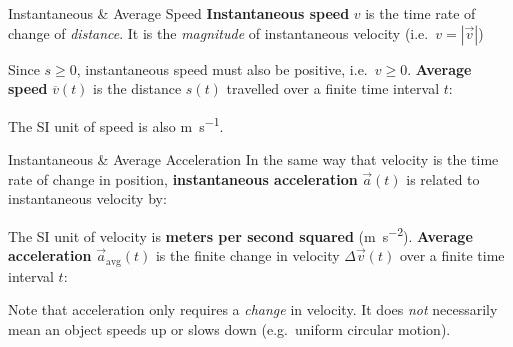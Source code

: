 \documentclass[12pt,compress,aspectratio=169,dvipsnames]{beamer}
\begin{document}
\begin{frame}{Instantaneous \& Average Speed}
  \textbf{Instantaneous speed} $v$ is the time rate of change of
  \emph{distance}. It is the \emph{magnitude} of instantaneous velocity
  (i.e.\ $v=|\vec v|$)


  Since $s\geq 0$, instantaneous speed must also be positive, i.e.\ $v\geq 0$.
  \textbf{Average speed} $\overline{v}(t)$ is the distance $s(t)$ travelled
  over a finite time interval $t$:
  

  The SI unit of speed is also \si{\metre\per\second}.
\end{frame}





\begin{frame}{Instantaneous \& Average Acceleration}
  In the same way that velocity is the time rate of change in position,
  \textbf{instantaneous acceleration} $\vec a(t)$ is related to
  instantaneous velocity by:


  The SI unit of velocity is \textbf{meters per second squared}
  (\si{\metre\per\second\squared}). \textbf{Average acceleration}
  $\vec a_\text{avg}(t)$ is the finite change in velocity $\Delta\vec v(t)$ over
  a finite time interval $t$:


  Note that acceleration only requires a \emph{change} in velocity. It does
  \emph{not} necessarily mean an object speeds up or slows down (e.g.\ uniform
  circular motion).
\end{frame}
\end{document}
